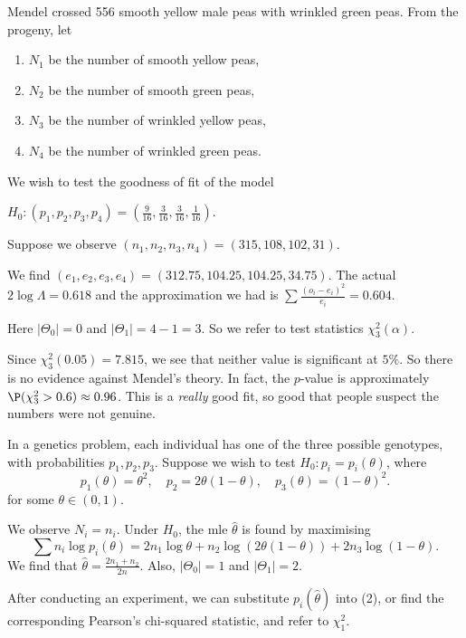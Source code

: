 \documentclass[a4paper]{article}
\begin{document}
\begin{eg}
  Mendel crossed 556 smooth yellow male peas with wrinkled green peas. From the progeny, let
  \begin{enumerate}
    \item $N_1$ be the number of smooth yellow peas,
    \item $N_2$ be the number of smooth green peas,
    \item $N_3$ be the number of wrinkled yellow peas,
    \item $N_4$ be the number of wrinkled green peas.
  \end{enumerate}
  We wish to test the goodness of fit of the model
  \begin{center}
    $H_0: (p_1, p_2, p_3, p_4) = \left(\frac{9}{16}, \frac{3}{16}, \frac{3}{16}, \frac{1}{16}\right)$.
  \end{center}
  Suppose we observe $(n_1, n_2, n_3, n_4) = (315, 108, 102, 31)$.

  We find $(e_1, e_2, e_3, e_4) = (312.75, 104.25, 104.25, 34.75)$. The actual $2\log \Lambda = 0.618$ and the approximation we had is $\sum \frac{(o_i - e_i)^2}{e_i} = 0.604$.

  Here $|\Theta_0| = 0$ and $|\Theta_1| = 4 - 1 = 3$. So we refer to test statistics $\chi_3^2(\alpha)$.

  Since $\chi_3^2(0.05) = 7.815$, we see that neither value is significant at $5\%$. So there is no evidence against Mendel's theory. In fact, the $p$-value is approximately $\P(\chi_3^2 > 0.6) \approx 0.96$. This is a \emph{really} good fit, so good that people suspect the numbers were not genuine.
\end{eg}

\begin{eg}
  In a genetics problem, each individual has one of the three possible genotypes, with probabilities $p_1, p_2, p_3$. Suppose we wish to test $H_0: p_i = p_i(\theta)$, where
  \[
    p_1(\theta) = \theta^2,\quad p_2 = 2\theta(1 - \theta), \quad p_3(\theta) = (1 - \theta)^2.
  \]
  for some $\theta \in (0, 1)$.

  We observe $N_i = n_i$. Under $H_0$, the mle $\hat{\theta}$ is found by maximising
  \[
    \sum n_i \log p_i(\theta) = 2n_1 \log \theta + n_2\log(2\theta(1 - \theta)) + 2n_3 \log (1 - \theta).
  \]
  We find that $\hat{\theta} = \frac{2n_1 + n_2}{2n}$. Also, $|\Theta_0| = 1$ and $|\Theta_1| = 2$.

  After conducting an experiment, we can substitute $p_i(\hat{\theta})$ into (2), or find the corresponding Pearson's chi-squared statistic, and refer to $\chi_1^2$.
\end{eg}
\end{document}
